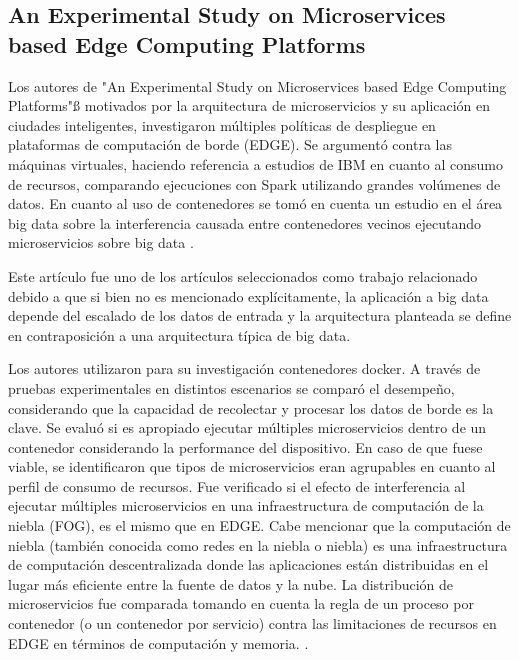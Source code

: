 \subsection{An Experimental Study on Microservices based Edge Computing Platforms
}

Los autores de "An Experimental Study on Microservices based Edge Computing Platforms"ß\cite{qu_experimental_2020} motivados por la arquitectura de microservicios y su aplicación en ciudades inteligentes, investigaron múltiples políticas de despliegue en plataformas de computación de borde (EDGE). Se argumentó contra las máquinas virtuales, haciendo referencia a estudios de IBM en cuanto al consumo de recursos, comparando ejecuciones con Spark \cite{ApacheSpark} utilizando grandes volúmenes de datos. En cuanto al uso de contenedores se tomó en cuenta un estudio en el área big data sobre la interferencia causada entre contenedores vecinos ejecutando microservicios sobre big data \cite{BigDataWikipedia}.\par

Este artículo fue uno de los artículos seleccionados como trabajo relacionado debido a que si bien no es mencionado explícitamente, la aplicación a big data depende del escalado de los datos de entrada y la arquitectura planteada se define en contraposición a una arquitectura típica de big data.\par

Los autores utilizaron para su investigación contenedores docker.
A través de pruebas experimentales en distintos escenarios se comparó el desempeño, considerando que la capacidad de recolectar y procesar los datos de borde es la clave.
Se evaluó si es apropiado ejecutar múltiples microservicios dentro de un contenedor considerando la performance del dispositivo.
En caso de que fuese viable, se identificaron que tipos de microservicios eran agrupables en cuanto al perfil de consumo de recursos.
Fue verificado si el efecto de interferencia al ejecutar múltiples microservicios en una infraestructura de computación de la niebla (FOG), es el mismo que en EDGE. Cabe mencionar que la computación de niebla (también conocida como redes en la niebla o niebla)
es una infraestructura de computación descentralizada donde las aplicaciones están distribuidas en el lugar más eficiente entre la fuente de datos y la nube.
La distribución de microservicios fue comparada tomando en cuenta la regla de un proceso por contenedor (o un contenedor por servicio)
\cite{cont_por_serv}
contra las limitaciones de recursos en EDGE en términos de computación y memoria.
\cite{webfog}.\par

